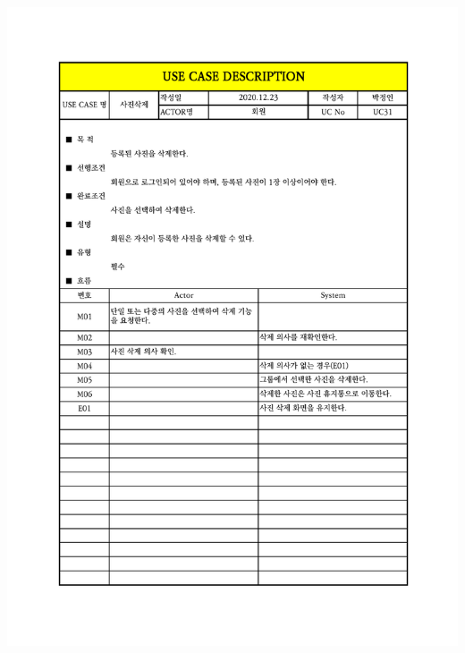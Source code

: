 {{{{{{{{{{{{{{{{{{{{{{{{{{{{{{{{{\includegraphics[width=1.1\textwidth]{./Figure/Design/Display/usecase/031.pdf} \\
}}}}}}}}}}}}}}}}}}}}}}}}}}}}}}}}}
